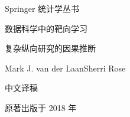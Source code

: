 \begin{titlepage}
\centering
\vspace*{2cm}
{\Large Springer 统计学丛书\par}
\vspace{1.5cm}
{\Huge\heiti 数据科学中的靶向学习\par}
\vspace{.8cm}
{\LARGE 复杂纵向研究的因果推断\par}
\vspace{1.8cm}
{\Large Mark J. van der Laan\quad Sherri Rose\par}
\vfill
{\large 中文译稿\par}
\vspace{.4cm}
{\normalsize 原著出版于 2018 年\par}
\end{titlepage}
